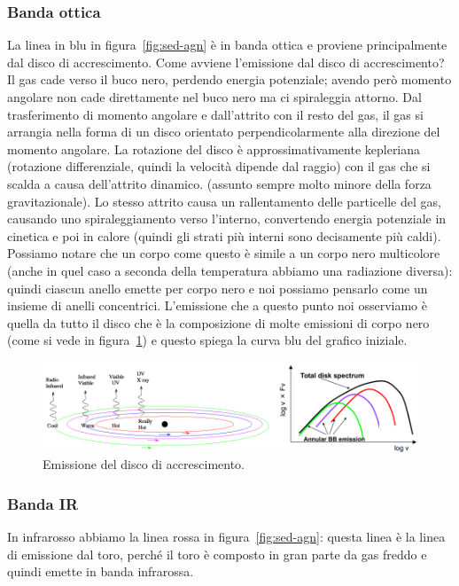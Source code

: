 \subsubsection{Banda ottica}
La linea in blu in figura~\ref{fig:sed-agn} è in banda ottica e proviene principalmente dal disco di accrescimento. Come avviene l'emissione dal disco di accrescimento? Il gas cade verso il buco nero, perdendo energia potenziale; avendo però momento angolare non cade direttamente nel buco nero ma ci spiraleggia attorno. Dal trasferimento di momento angolare e dall'attrito con il resto del gas, il gas si arrangia nella forma di un disco orientato perpendicolarmente alla direzione del momento angolare. La rotazione del disco è approssimativamente kepleriana (rotazione differenziale, quindi la velocità dipende dal raggio) con il gas che si scalda a causa dell'attrito dinamico. (assunto sempre molto minore della forza gravitazionale). Lo stesso attrito causa un rallentamento delle particelle del gas, causando uno spiraleggiamento verso l'interno, convertendo energia potenziale in cinetica e poi in calore (quindi gli strati più interni sono decisamente più caldi). Possiamo notare che un corpo come questo è simile a un corpo nero multicolore (anche in quel caso a seconda della temperatura abbiamo una radiazione diversa): quindi ciascun anello emette per corpo nero e noi possiamo pensarlo come un insieme di anelli concentrici. L'emissione che a questo punto noi osserviamo è quella da tutto il disco che è la composizione di molte emissioni di corpo nero (come si vede in figura~\ref{fig:emissione-del-disco-di-accrescimento}) e questo spiega la curva blu del grafico iniziale.

\begin{figure}
    \centering
    \includegraphics[width = \textwidth]{immagini/emissione-del-disco-di-accrescimento.png}
    \caption{Emissione del disco di accrescimento.}
    \label{fig:emissione-del-disco-di-accrescimento}
\end{figure}

\subsubsection{Banda IR}
In infrarosso abbiamo la linea rossa in figura~\ref{fig:sed-agn}: questa linea è la linea di emissione dal toro, perché il toro è composto in gran parte da gas freddo e quindi emette in banda infrarossa. 

